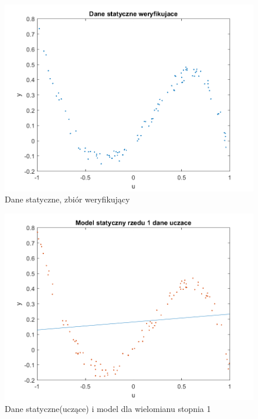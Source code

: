 \documentclass{article}
\begin{document}
\begin{figure}
\centering
\includegraphics[width=0.95\linewidth]{dane_statyczne_weryf}
\caption{Dane statyczne, zbiór weryfikujący}
\label{fig:danestatyczneweryf}
\end{figure}

\begin{figure}
\centering
\includegraphics[width=0.95\linewidth]{dane_statyczne_model_rzedu_1_uczace}
\caption{Dane statyczne(uczące) i model dla wielomianu stopnia 1}
\label{fig:danestatyczneuczace1}
\end{figure}
\end{document}
